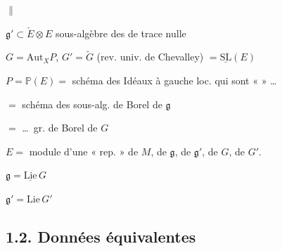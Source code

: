 \documentclass[11pt,a4paper]{article}
\begin{document}
$\|$

$\mathfrak{g}' \subset \check{E}\otimes E$ sous-algèbre des  de trace nulle

$G = \mathrm{Aut}_X P$, \quad $G' = \widetilde{G}$ (rev. univ. de Chevalley) $= \underline{\mathrm{SL}}(E)$ 

$P = \mathbb{P}(E) =$ schéma des Idéaux à gauche loc.  qui sont «  »  \ldots\ \struck{\ill{}}

$=$ schéma des sous-alg. de Borel de $\mathfrak{g}$ 

$=$ \ldots\ gr. de Borel de $G$ 



$E =$ module d'une « rep.  » de \struck{\ill{}} $M$, de $\mathfrak{g}$, de $\mathfrak{g}'$, de $G$, de $G'$.

$\mathfrak{g} = \underline{\mathrm{Lie}}\,G$

$\mathfrak{g}' = \mathrm{Lie}\,G'$

\subsection{1.2. Données équivalentes}
\end{document}
